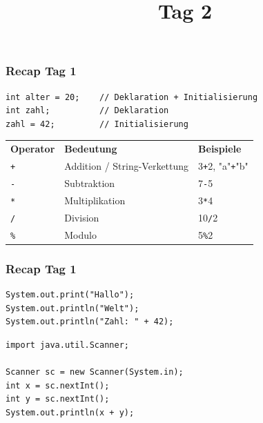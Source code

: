 \documentclass{../../presentation}
\title{\vkTitle\ Tag 2}
\author{\vkAuthors}
\institute{\vkInstitute}
\date{\vkDateDayTwo}
\begin{document}
\begin{frame}
	\titlepage
\end{frame}

\begin{frame}[fragile]
	\frametitle{Recap Tag 1}
	\pause
	\begin{center}
		\begin{verbatim}
int alter = 20;    // Deklaration + Initialisierung
int zahl;          // Deklaration
zahl = 42;         // Initialisierung
    \end{verbatim}

		\pause
		\begin{tabular}{l l l}
			\rowcolor{tablehead}
			\textbf{Operator} & \textbf{Bedeutung}           & \textbf{Beispiele}             \\
			\texttt{+}        & Addition / String-Verkettung & 3\texttt{+}2, "a"\texttt{+}"b" \\
			\texttt{-}        & Subtraktion                  & 7\texttt{-}5                   \\
			\texttt{*}        & Multiplikation               & 3\texttt{*}4                   \\
			\texttt{/}        & Division                     & 10\texttt{/}2                  \\
			\texttt{\%}       & Modulo                       & 5\texttt{\%}2                  \\
		\end{tabular}
	\end{center}
\end{frame}

\begin{frame}[fragile]
	\frametitle{Recap Tag 1}
	\pause
	\begin{verbatim}
System.out.print("Hallo");
System.out.println("Welt");
System.out.println("Zahl: " + 42);
  \end{verbatim}
	\pause
	\begin{verbatim}
import java.util.Scanner;

Scanner sc = new Scanner(System.in);
int x = sc.nextInt();
int y = sc.nextInt();
System.out.println(x + y);
  \end{verbatim}
\end{frame}
\end{document}
